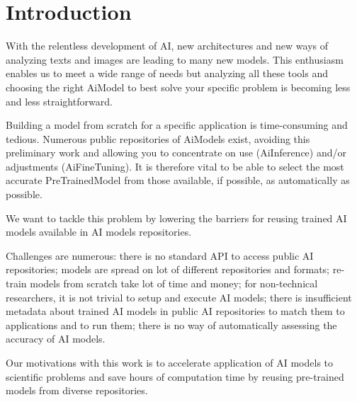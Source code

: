 \section{Introduction}
\label{sec:intro}

With the relentless development of \Gls{AI}, new
architectures and new ways of analyzing texts and images are leading to many new
models. This enthusiasm enables us to meet a wide range of needs but analyzing
all these tools and choosing the right \Gls{AiModel} to best solve your specific
problem is becoming less and less straightforward.

Building a model from scratch for a specific application is time-consuming and
tedious. Numerous public repositories of \Gls{AiModel}s exist, avoiding this
preliminary work and allowing you to concentrate on use (\Gls{AiInference}) and/or
adjustments (\Gls{AiFineTuning}). It is therefore vital to be able to select the most
accurate \Gls{PreTrainedModel} from those available, if possible, as automatically
as possible.

We want to tackle this problem by lowering the barriers for reusing trained AI
models available in AI models repositories.

Challenges are numerous: there is no
standard API to access public AI repositories; models are spread on
lot of different repositories and formats; re-train models from scratch take lot
of time and money; for non-technical researchers, it is not trivial to setup and
execute AI models; there is insufficient metadata about trained AI models in
public AI repositories to match them to applications and to run them; there
is no way of automatically assessing the accuracy of AI models.

Our motivations with this work is to accelerate application of AI models to
scientific problems and save hours of computation time by reusing pre-trained
models from diverse repositories.




